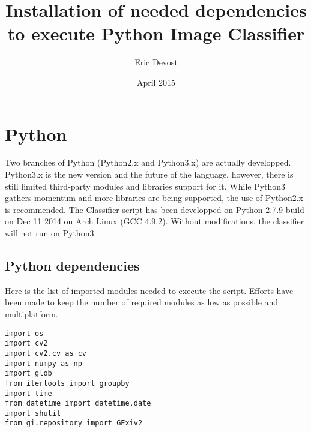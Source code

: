 \documentclass[a4paper, 11pt]{article}
\title{Installation of needed dependencies to execute Python Image Classifier}
\author{Eric Devost}
\date{April 2015}
\begin{document}
\maketitle
\newpage


\section{Python}
Two branches of Python (Python2.x and Python3.x) are actually developped. Python3.x is the new version and the future of the language, however, there is still limited third-party modules and libraries support for it. While Python3 gathers momentum and more libraries are being supported, the use of Python2.x is recommended. The Classifier script has been developped on Python 2.7.9 build on Dec 11 2014 on Arch Linux (GCC 4.9.2). Without modifications, the classifier will not run on Python3.

\subsection{Python dependencies}
Here is the list of imported modules needed to execute the script. Efforts have been made to keep the number of required modules as low as possible and multiplatform.

\begin{lstlisting}
import os
import cv2
import cv2.cv as cv
import numpy as np
import glob
from itertools import groupby
import time
from datetime import datetime,date
import shutil
from gi.repository import GExiv2

\end{lstlisting}
\end{document}
